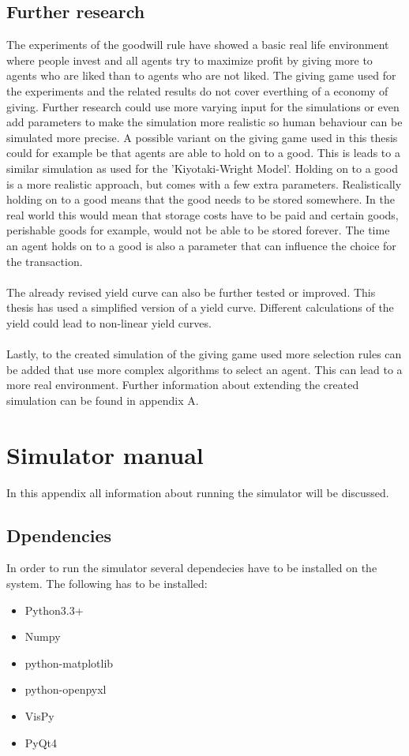 \documentclass[twoside,openright]{uva-bachelor-thesis}
\begin{document}
\section{Further research}
The experiments of the goodwill rule have showed a basic real life environment where people invest and all agents try to maximize profit by giving more to agents who are liked than to agents who are not liked. The giving game used for the experiments and the related results do not cover everthing of a economy of giving. Further research could use more varying input for the simulations or even add parameters to make the simulation more realistic so human behaviour can be simulated more precise. A possible variant on the giving game used in this thesis could for example be that agents are able to hold on to a good. This is leads to a similar simulation as used for the 'Kiyotaki-Wright Model'\cite{moranmoney}. Holding on to a good is a more realistic approach, but comes with a few extra parameters. Realistically holding on to a good means that the good needs to be stored somewhere. In the real world this would mean that storage costs have to be paid and certain goods, perishable goods for example, would not be able to be stored forever. The time an agent holds on to a good is also a parameter that can influence the choice for the transaction.
\\
\\
The already revised yield curve can also be further tested or improved. This thesis has used a simplified version of a yield curve. Different calculations of the yield could lead to non-linear yield curves. \\
\\
Lastly, to the created simulation of the giving game used more selection rules can be added that use more complex algorithms to select an agent. This can lead to a more real environment. Further information about extending the created simulation can be found in appendix A.





\appendix
\chapter{Simulator manual}
In this appendix all information about running the simulator will be discussed.

\section{Dpendencies}
In order to run the simulator several dependecies have to be installed on the system. The following has to be installed:
\begin{itemize}
\item Python3.3+
\item Numpy
\item python-matplotlib
\item python-openpyxl
\item VisPy
\item PyQt4
\end{itemize}
\end{document}

